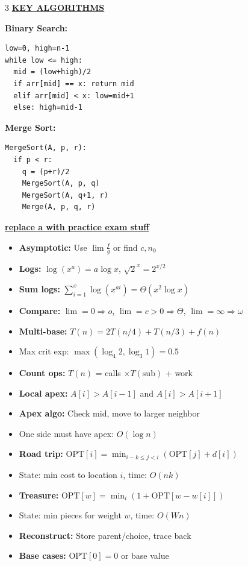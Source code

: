 \documentclass[7pt,landscape]{article}
\newcommand{\sect}[1]{\vspace{1mm}\textbf{\underline{#1}}\vspace{0.5mm}}
\begin{document}
\begin{multicols}{3}
\sect{KEY ALGORITHMS}

\textbf{Binary Search:}
\begin{verbatim}
low=0, high=n-1
while low <= high:
  mid = (low+high)/2
  if arr[mid] == x: return mid
  elif arr[mid] < x: low=mid+1
  else: high=mid-1
\end{verbatim}

\textbf{Merge Sort:}
\begin{verbatim}
MergeSort(A, p, r):
  if p < r:
    q = (p+r)/2
    MergeSort(A, p, q)
    MergeSort(A, q+1, r)
    Merge(A, p, q, r)
\end{verbatim}

\vspace{0.3cm}

\sect{replace a with practice exam stuff}

\begin{itemize}[leftmargin=*, nosep]
\item \textbf{Asymptotic:} Use $\lim \frac{f}{g}$ or find $c,n_0$
\item \textbf{Logs:} $\log(x^a) = a\log x$, $\sqrt{2}^x = 2^{x/2}$
\item \textbf{Sum logs:} $\sum_{i=1}^x \log(x^{ai}) = \Theta(x^2\log x)$
\item \textbf{Compare:} $\lim=0 \Rightarrow o$, $\lim=c>0 \Rightarrow \Theta$, $\lim=\infty \Rightarrow \omega$
\item \textbf{Multi-base:} $T(n)=2T(n/4)+T(n/3)+f(n)$
\item Max crit exp: $\max(\log_4 2, \log_3 1) = 0.5$
\item \textbf{Count ops:} $T(n)$ = calls $\times T(\text{sub})$ + work
\item \textbf{Local apex:} $A[i] > A[i-1]$ and $A[i] > A[i+1]$
\item \textbf{Apex algo:} Check mid, move to larger neighbor
\item One side must have apex: $O(\log n)$
\item \textbf{Road trip:} $\text{OPT}[i]=\min_{i-k\leq j<i}(\text{OPT}[j]+d[i])$
\item State: min cost to location $i$, time: $O(nk)$
\item \textbf{Treasure:} $\text{OPT}[w]=\min_i(1+\text{OPT}[w-w[i]])$
\item State: min pieces for weight $w$, time: $O(Wn)$
\item \textbf{Reconstruct:} Store parent/choice, trace back
\item \textbf{Base cases:} $\text{OPT}[0]=0$ or base value

\end{itemize}
\end{multicols}
\end{document}

